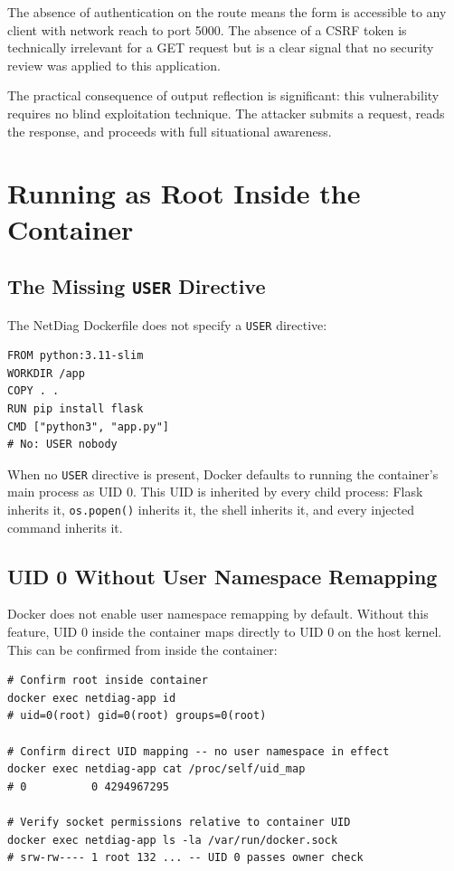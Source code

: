 The absence of authentication on the route means the form is accessible to any client with network reach to port 5000. The absence of a CSRF token is technically irrelevant for a GET request but is a clear signal that no security review was applied to this application.

The practical consequence of output reflection is significant: this vulnerability requires no blind exploitation technique. The attacker submits a request, reads the response, and proceeds with full situational awareness.

\section{Running as Root Inside the Container}

\subsection{The Missing \texttt{USER} Directive}

The NetDiag Dockerfile does not specify a \texttt{USER} directive:

\begin{lstlisting}
FROM python:3.11-slim
WORKDIR /app
COPY . .
RUN pip install flask
CMD ["python3", "app.py"]
# No: USER nobody
\end{lstlisting}

When no \texttt{USER} directive is present, Docker defaults to running the container's main process as UID 0. This UID is inherited by every child process: Flask inherits it, \texttt{os.popen()} inherits it, the shell inherits it, and every injected command inherits it.

\subsection{UID 0 Without User Namespace Remapping}

Docker does not enable user namespace remapping by default. Without this feature, UID 0 inside the container maps directly to UID 0 on the host kernel. This can be confirmed from inside the container:

\begin{lstlisting}
# Confirm root inside container
docker exec netdiag-app id
# uid=0(root) gid=0(root) groups=0(root)

# Confirm direct UID mapping -- no user namespace in effect
docker exec netdiag-app cat /proc/self/uid_map
# 0          0 4294967295

# Verify socket permissions relative to container UID
docker exec netdiag-app ls -la /var/run/docker.sock
# srw-rw---- 1 root 132 ... -- UID 0 passes owner check
\end{lstlisting}

